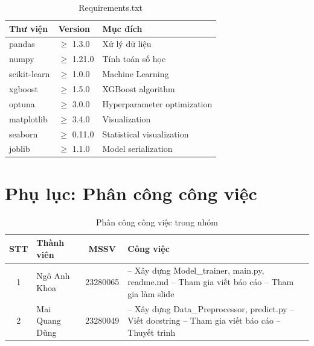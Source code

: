 \documentclass[12pt,a4paper]{article}
\begin{document}
\begin{table}[H]
\centering
\caption{Requirements.txt}
\label{tab:requirements}
\begin{tabular}{|l|l|p{6cm}|}
\hline
\textbf{Thư viện} & \textbf{Version} & \textbf{Mục đích} \\
\hline
pandas & $\geq$ 1.3.0 & Xử lý dữ liệu \\
\hline
numpy & $\geq$ 1.21.0 & Tính toán số học \\
\hline
scikit-learn & $\geq$ 1.0.0 & Machine Learning \\
\hline
xgboost & $\geq$ 1.5.0 & XGBoost algorithm \\
\hline
optuna & $\geq$ 3.0.0 & Hyperparameter optimization \\
\hline
matplotlib & $\geq$ 3.4.0 & Visualization \\
\hline
seaborn & $\geq$ 0.11.0 & Statistical visualization \\
\hline
joblib & $\geq$ 1.1.0 & Model serialization \\
\hline
\end{tabular}
\end{table}

\section{Phụ lục: Phân công công việc}

\begin{table}[H]
\centering
\caption{Phân công công việc trong nhóm}
\label{tab:task_assignment}
\begin{tabular}{|c|l|c|>{\raggedright\arraybackslash}p{7cm}|}
\hline
\textbf{STT} & \textbf{Thành viên} & \textbf{MSSV} & \textbf{Công việc} \\
\hline
1 & Ngô Anh Khoa & 23280065 & 
-- Xây dựng Model\_trainer, main.py, readme.md \newline
-- Tham gia viết báo cáo \newline
-- Tham gia làm slide \\
\hline
2 & Mai Quang Dũng & 23280049 & 
-- Xây dựng Data\_Preprocessor, predict.py \newline
-- Viết docstring \newline
-- Tham gia viết báo cáo \newline
-- Thuyết trình \\
\hline
\end{tabular}
\end{table}
\end{document}
